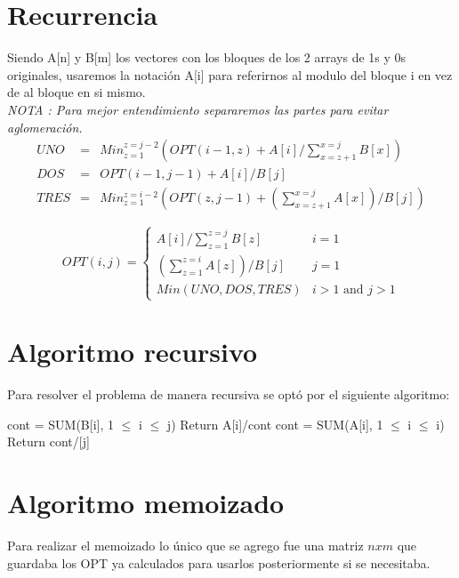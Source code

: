 \documentclass[12pt]{article}
\newcommand{\TITLE}[1]{\item[#1]}
\newcommand{\algcost}[2]{\strut\hfill\makebox[1.5cm][l]{#1}\makebox[4cm][l]{#2}}
\begin{document}
\section{Recurrencia}
Siendo A[n] y B[m] los vectores con los bloques de los 2 arrays de 1s y 0s originales, usaremos la notación A[i] para referirnos al modulo del bloque i en vez de al bloque en si mismo.\\
\textit{NOTA : Para mejor entendimiento separaremos las partes para evitar aglomeración.}\\
\begin{eqnarray*}
UNO&=& Min_{z=1}^{z=j-2}(OPT(i-1,z) + A[i]/\sum_{x=z+1}^{x=j}B[x]) \\
DOS&=& OPT(i-1,j-1) + A[i]/B[j] \\
TRES&=& Min_{z=1}^{z=i-2}(OPT(z,j-1) + (\sum_{x=z+1}^{x=j}A[x])/B[j] )
\end{eqnarray*}

\begin{equation*}
OPT(i,j) =
\begin{cases}
A[i]/\sum_{z=1}^{z=j}B[z] & i = 1\\
(\sum_{z=1}^{z=i}A[z])/B[j] & j=1\\
Min(UNO,DOS,TRES) & i>1 \text{ and } j>1

\end{cases}
\end{equation*}

\section{Algoritmo recursivo}
Para resolver el problema de manera recursiva se optó por el siguiente algoritmo:\\
\begin{algorithmic}[1]
\TITLE{\textsc{opt}$(i ,j)$}
    \IF{i = 0  \algcost{$.$}{$.$}}
        \STATE cont = SUM(B[i], 1 $\leq$ i $\leq$ j)
        \STATE Return A[i]/cont
    \ENDIF
        \STATE cont = SUM(A[i], 1 $\leq$ i $\leq$ i)
        \STATE Return cont/[j]
    \ENDIF
\end{algorithmic}
\section{Algoritmo memoizado}
Para realizar el memoizado lo único que se agrego fue una matriz $n x m$ que guardaba los OPT ya calculados para usarlos posteriormente si se necesitaba.
\end{document}
